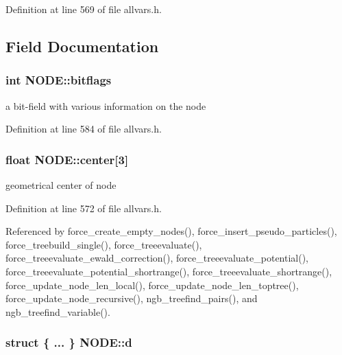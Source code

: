 Definition at line 569 of file allvars.h.



\subsection{Field Documentation}
\hypertarget{structNODE_a3678932e5e5b2947409657de4b70e8fc}{
\subsubsection[{bitflags}]{\setlength{\rightskip}{0pt plus 5cm}int {\bf NODE::bitflags}}}
\label{structNODE_a3678932e5e5b2947409657de4b70e8fc}
a bit-\/field with various information on the node 

Definition at line 584 of file allvars.h.

\hypertarget{structNODE_a27584ddd52a800cbf36c4de8e3fb4bc9}{
\subsubsection[{center}]{\setlength{\rightskip}{0pt plus 5cm}float {\bf NODE::center}\mbox{[}3\mbox{]}}}
\label{structNODE_a27584ddd52a800cbf36c4de8e3fb4bc9}
geometrical center of node 

Definition at line 572 of file allvars.h.



Referenced by force\_\-create\_\-empty\_\-nodes(), force\_\-insert\_\-pseudo\_\-particles(), force\_\-treebuild\_\-single(), force\_\-treeevaluate(), force\_\-treeevaluate\_\-ewald\_\-correction(), force\_\-treeevaluate\_\-potential(), force\_\-treeevaluate\_\-potential\_\-shortrange(), force\_\-treeevaluate\_\-shortrange(), force\_\-update\_\-node\_\-len\_\-local(), force\_\-update\_\-node\_\-len\_\-toptree(), force\_\-update\_\-node\_\-recursive(), ngb\_\-treefind\_\-pairs(), and ngb\_\-treefind\_\-variable().

\hypertarget{structNODE_a5ab829c8c9c85992ba220635f776de74}{
\subsubsection[{d}]{\setlength{\rightskip}{0pt plus 5cm}struct \{ ... \} 
     {\bf NODE::d}}}
\label{structNODE_a5ab829c8c9c85992ba220635f776de74}


